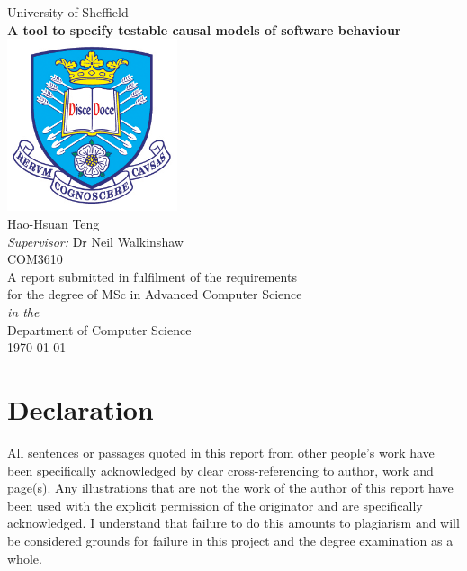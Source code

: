 \documentclass[11pt,oneside]{book}
\begin{document}
\frontmatter

\begin{titlepage}


\begin{center}
{\LARGE University of Sheffield}\\[1.5cm]
\linespread{1.2}\huge {\bfseries A tool to specify testable causal models of software behaviour}\\[1.5cm]
\linespread{1}
\includegraphics[width=5cm]{images/tuoslogo.png}\\[1cm]
{\Large Hao-Hsuan Teng}\\[1cm]
{\large \emph{Supervisor:} Dr Neil Walkinshaw}\\[1cm]
{\Large COM3610}\\[1cm]
\large A report submitted in fulfilment of the requirements\\ for the degree of MSc in Advanced Computer Science\\[0.3cm] 
\textit{in the}\\[0.3cm]
Department of Computer Science\\[2cm]
\today
\end{center}

\end{titlepage}


\newpage
\chapter*{\Large Declaration}


All sentences or passages quoted in this report from other people's work have been specifically acknowledged by clear cross-referencing to author, work and page(s). Any illustrations that are not the work of the author of this report have been used with the explicit permission of the originator and are specifically acknowledged. I understand that failure to do this amounts to plagiarism and will be considered grounds for failure in this project and the degree examination as a whole.\\[1cm]
\end{document}
